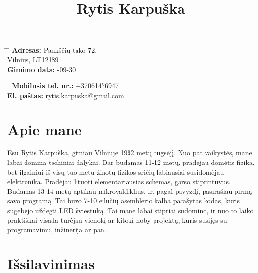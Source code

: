 \documentclass[12]{article}
\begin{document}
\title{Rytis Karpuška}


\parbox{0.5\textwidth}{ %
\begin{tabbing} %
\hspace{3cm} \= \hspace{4cm} \= \kill %
{\bf Adresas:} \> Paukščių tako 72,\\ %
\> Vilnius, LT12189\\ %
{\bf Gimimo data:} -09-30\\ %
\end{tabbing}}
\hfill %
\parbox{0.5\textwidth}{ %
\begin{tabbing} %
\hspace{3cm} \= \hspace{4cm} \= \kill %
{\bf Mobilusis tel. nr.:} \> +37061476947 \\ %
{\bf El. paštas:} \> \href{mailto:rytis.karpuska@gmail.com}{rytis.karpuska@gmail.com} \\ %
\end{tabbing}}

\section{Apie mane}

Esu Rytis Karpuška, gimiau Vilniuje 1992 metų rugsėjį. Nuo pat vaikystės, mane labai domina techiniai dalykai.
Dar būdamas 11-12 metų, pradėjau domėtis fizika, bet ilgainiui iš visų tuo metu žinotų fizikos sričių labiausiai susidomėjau elektronika.
Pradėjau lituoti elementariausias schemas, garso stiprintuvus.
Būdamas 13-14 metų aptikau mikrovaldiklius, ir, pagal pavyzdį, pasirašiau pirmą savo programą.
Tai buvo 7-10 eilučių asemblerio kalba parašytas kodas, kuris sugebėjo uždegti LED šviestuką.
Tai mane labai stipriai sudomino, ir nuo to laiko praktiškai visada turėjau vienokį ar kitokį hoby projektą, kuris susijęs su programavimu, inžinerija ar pan.


\section{Išsilavinimas}

\end{document}
